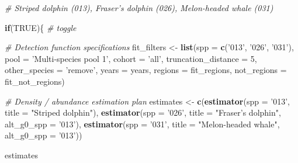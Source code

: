 \documentclass[
]{book}
\newenvironment{Shaded}{\begin{snugshade}}{\end{snugshade}}
\newcommand{\CommentTok}[1]{\textcolor[rgb]{0.56,0.35,0.01}{\textit{#1}}}
\newcommand{\ControlFlowTok}[1]{\textcolor[rgb]{0.13,0.29,0.53}{\textbf{#1}}}
\newcommand{\DataTypeTok}[1]{\textcolor[rgb]{0.13,0.29,0.53}{#1}}
\newcommand{\DecValTok}[1]{\textcolor[rgb]{0.00,0.00,0.81}{#1}}
\newcommand{\KeywordTok}[1]{\textcolor[rgb]{0.13,0.29,0.53}{\textbf{#1}}}
\newcommand{\NormalTok}[1]{#1}
\newcommand{\OtherTok}[1]{\textcolor[rgb]{0.56,0.35,0.01}{#1}}
\newcommand{\StringTok}[1]{\textcolor[rgb]{0.31,0.60,0.02}{#1}}
\begin{document}
\begin{Shaded}
\begin{Highlighting}[]
\CommentTok{# Striped dolphin (013), Fraser's dolphin (026), Melon-headed whale (031)}

\ControlFlowTok{if}\NormalTok{(}\OtherTok{TRUE}\NormalTok{)\{ }\CommentTok{# toggle}

  \CommentTok{# Detection function specifications}
\NormalTok{  fit_filters <-}
\StringTok{    }\KeywordTok{list}\NormalTok{(}\DataTypeTok{spp =} \KeywordTok{c}\NormalTok{(}\StringTok{'013'}\NormalTok{, }\StringTok{'026'}\NormalTok{, }\StringTok{'031'}\NormalTok{),}
         \DataTypeTok{pool =} \StringTok{'Multi-species pool 1'}\NormalTok{,}
         \DataTypeTok{cohort =} \StringTok{'all'}\NormalTok{,}
         \DataTypeTok{truncation_distance =} \DecValTok{5}\NormalTok{,}
         \DataTypeTok{other_species =} \StringTok{'remove'}\NormalTok{,}
         \DataTypeTok{years =}\NormalTok{ years,}
         \DataTypeTok{regions =}\NormalTok{ fit_regions,}
         \DataTypeTok{not_regions =}\NormalTok{ fit_not_regions)}

  \CommentTok{# Density / abundance estimation plan}
\NormalTok{  estimates <-}
\StringTok{    }\KeywordTok{c}\NormalTok{(}\KeywordTok{estimator}\NormalTok{(}\DataTypeTok{spp =} \StringTok{'013'}\NormalTok{, }\DataTypeTok{title =} \StringTok{"Striped dolphin"}\NormalTok{),}
      \KeywordTok{estimator}\NormalTok{(}\DataTypeTok{spp =} \StringTok{'026'}\NormalTok{, }\DataTypeTok{title =} \StringTok{"Fraser's dolphin"}\NormalTok{, }\DataTypeTok{alt_g0_spp =} \StringTok{'013'}\NormalTok{),}
      \KeywordTok{estimator}\NormalTok{(}\DataTypeTok{spp =} \StringTok{'031'}\NormalTok{, }\DataTypeTok{title =} \StringTok{"Melon-headed whale"}\NormalTok{, }\DataTypeTok{alt_g0_spp =} \StringTok{'013'}\NormalTok{))}
  
\NormalTok{  estimates}
  

\end{Highlighting}
\end{Shaded}
\end{document}
